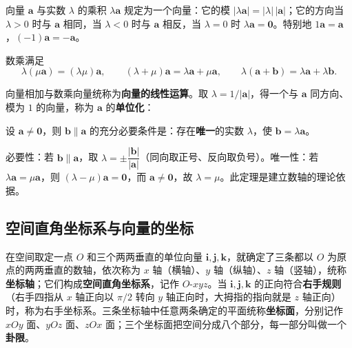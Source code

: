 \begin{definition}
向量 $\boldsymbol{a}$ 与实数 $\lambda$ 的乘积 $\lambda\boldsymbol{a}$ 规定为一个向量：它的模 $|\lambda\boldsymbol{a}|=|\lambda|\,|\boldsymbol{a}|$；它的方向当 $\lambda>0$ 时与 $\boldsymbol{a}$ 相同，当 $\lambda<0$ 时与 $\boldsymbol{a}$ 相反，当 $\lambda=0$ 时 $\lambda\boldsymbol{a}=\boldsymbol{0}$。特别地 $1\boldsymbol{a}=\boldsymbol{a}$，$(-1)\boldsymbol{a}=-\boldsymbol{a}$。
\end{definition}

\begin{theorem}
数乘满足
\[
\lambda(\mu\boldsymbol{a})=(\lambda\mu)\boldsymbol{a},\qquad
(\lambda+\mu)\boldsymbol{a}=\lambda\boldsymbol{a}+\mu\boldsymbol{a},\qquad
\lambda(\boldsymbol{a}+\boldsymbol{b})=\lambda\boldsymbol{a}+\lambda\boldsymbol{b}.
\]
\end{theorem}

向量相加与数乘向量统称为\textbf{向量的线性运算}。取 $\lambda=1/|\boldsymbol{a}|$，得一个与 $\boldsymbol{a}$ 同方向、模为 $1$ 的向量，称为 $\boldsymbol{a}$ 的\textbf{单位化}：


\begin{theorem}[两向量平行的充要条件]
设 $\boldsymbol{a}\neq\boldsymbol{0}$，则 $\boldsymbol{b}\parallel\boldsymbol{a}$ 的充分必要条件是：存在\textbf{唯一}的实数 $\lambda$，使 $\boldsymbol{b}=\lambda\boldsymbol{a}$。
\end{theorem}

必要性：若 $\boldsymbol{b}\parallel\boldsymbol{a}$，取 $\lambda=\pm\dfrac{|\boldsymbol{b}|}{|\boldsymbol{a}|}$（同向取正号、反向取负号）。唯一性：若 $\lambda\boldsymbol{a}=\mu\boldsymbol{a}$，则 $(\lambda-\mu)\boldsymbol{a}=\boldsymbol{0}$，而 $\boldsymbol{a}\neq\boldsymbol{0}$，故 $\lambda=\mu$。此定理是建立数轴的理论依据。

\subsection{空间直角坐标系与向量的坐标}

在空间取定一点 $O$ 和三个两两垂直的单位向量 $\boldsymbol{i},\boldsymbol{j},\boldsymbol{k}$，就确定了三条都以 $O$ 为原点的两两垂直的数轴，依次称为 $x$ 轴（横轴）、$y$ 轴（纵轴）、$z$ 轴（竖轴），统称\textbf{坐标轴}；它们构成\textbf{空间直角坐标系}，记作 $O$-$xyz$。当 $\boldsymbol{i},\boldsymbol{j},\boldsymbol{k}$ 的正向符合\textbf{右手规则}（右手四指从 $x$ 轴正向以 $\pi/2$ 转向 $y$ 轴正向时，大拇指的指向就是 $z$ 轴正向）时，称为右手坐标系。三条坐标轴中任意两条确定的平面统称\textbf{坐标面}，分别记作 $xOy$ 面、$yOz$ 面、$zOx$ 面；三个坐标面把空间分成八个部分，每一部分叫做一个\textbf{卦限}。

